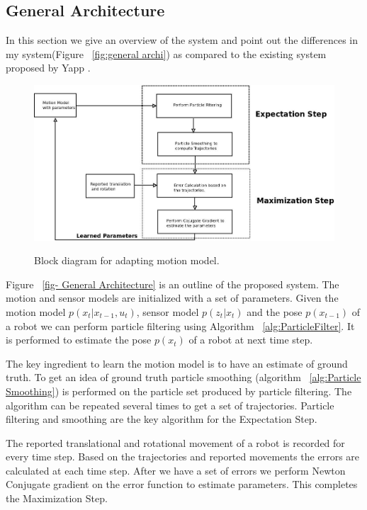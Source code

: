 \documentclass[12pt,draft]{dalcsthesis}
\begin{document}
\subsection{General Architecture}
In this section we give an overview of the system and point out the differences in my system(Figure ~\ref{fig:general archi}) as compared to the existing system proposed by Yapp \cite{Yap2008}. 
\begin{figure}
  \centering
     {\includegraphics[height = 3.0 in]{Diagram1.jpeg}}
  \caption{\label{fig-General Architecture} Block diagram for adapting motion model.}
\end{figure}
Figure ~\ref{fig- General Architecture} is an outline of the proposed system. The motion and sensor models are initialized with a set of parameters. Given the motion model $p(x_{t}|x_{t-1},u_{t})$, sensor model $p(z_{t}|x_{t})$ and the pose $p(x_{t-1})$ of a robot we can perform particle filtering using Algorithm ~\ref{alg:ParticleFilter}. It is performed to estimate the pose $p(x_{t})$ of a robot at next time step. 

The key ingredient to learn the motion model is to have an estimate of ground truth. To get an idea of ground truth particle smoothing (algorithm ~\ref{alg:Particle Smoothing}) is performed on the particle set produced by particle filtering. The algorithm can be repeated several times to get a set of trajectories. Particle filtering and smoothing are the key algorithm for the Expectation Step. 

The reported translational and rotational movement of a robot is recorded for every time step. Based on the trajectories and reported movements the errors are calculated at each time step. After we have a set of errors we perform Newton Conjugate gradient on the error function to estimate parameters. This completes the Maximization Step.
\end{document}
